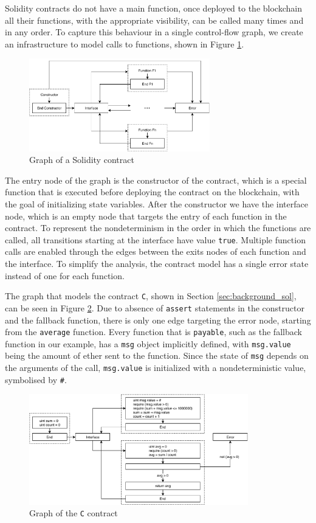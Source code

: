Solidity contracts do not have a main function, once deployed to the blockchain all their functions, with the appropriate visibility, can be called many times and in any order. To capture this behaviour in a single control-flow graph, we create an infrastructure to model calls to functions, shown in Figure \ref{fig:cfg_contract-general}.

\begin{figure}[ht]
	\centering
	\includegraphics[width=0.7\textwidth]{images/contract-general}
	\caption{Graph of a Solidity contract}
	\label{fig:cfg_contract-general}
\end{figure}

The entry node of the graph is the constructor of the contract, which is a special function that is executed before deploying the contract on the blockchain, with the goal of initializing state variables. After the constructor we have the interface node, which is an empty node that targets the entry of each function in the contract. To represent the nondeterminism in the order in which the functions are called, all transitions starting at the interface have value \texttt{true}. Multiple function calls are enabled through the edges between the exits nodes of each function and the interface. To simplify the analysis, the contract model has a single error state instead of one for each function. 

The graph that models the contract \texttt{C}, shown in Section \ref{sec:background_sol}, can be seen in Figure \ref{fig:cfg_contract-c}. Due to absence of \texttt{assert} statements in the constructor and the fallback function, there is only one edge targeting the error node, starting from the \texttt{average} function. Every function that is \texttt{payable}, such as the fallback function in our example, has a \texttt{msg} object implicitly defined, with \texttt{msg.value} being the amount of ether sent to the function. Since the state of \texttt{msg} depends on the arguments of the call, \texttt{msg.value} is initialized with a nondeterministic value, symbolised by \texttt{\#}.

\begin{figure}[ht]
	\centering
	\includegraphics[width=0.85\textwidth]{images/contract-c}
	\caption{Graph of the \texttt{C} contract}
	\label{fig:cfg_contract-c}
\end{figure}
